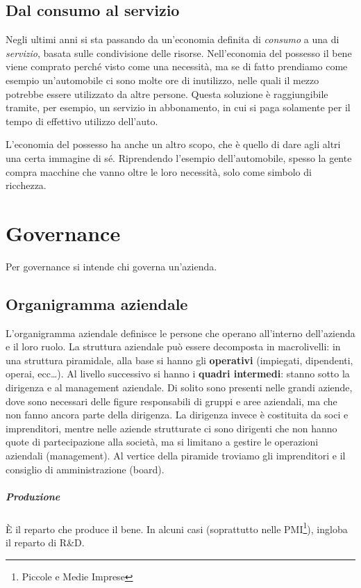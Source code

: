 \section{Dal consumo al servizio} 

Negli ultimi anni si sta passando da un'economia definita di \textit{consumo} a
una di \textit{servizio}, basata sulle condivisione delle risorse.
Nell'economia del possesso il bene viene comprato perché visto come una
necessità, ma se di fatto prendiamo come esempio un'automobile ci sono molte ore
di inutilizzo, nelle quali il mezzo potrebbe essere utilizzato da altre persone.
Questa soluzione è raggiungibile tramite, per esempio, un servizio in
abbonamento, in cui si paga solamente per il tempo di effettivo utilizzo 
dell'auto.

L'economia del possesso ha anche un altro scopo, che è quello di dare agli altri
una certa immagine di sé. Riprendendo l'esempio dell'automobile, spesso la gente
compra macchine che vanno oltre le loro necessità, solo come simbolo di 
ricchezza.


\chapter{Governance}

Per governance si intende chi governa un'azienda.

\section{Organigramma aziendale}
L'organigramma aziendale definisce le persone che operano all'interno
dell'azienda e il loro ruolo. La struttura aziendale può essere decomposta in
macrolivelli: in una struttura piramidale, alla base si hanno gli
\textbf{operativi} (impiegati, dipendenti, operai, ecc\dots). Al livello
successivo si hanno i \textbf{quadri intermedi}: stanno sotto la dirigenza e al
management aziendale. Di solito sono presenti nelle grandi aziende, dove sono
necessari delle figure responsabili di gruppi e aree aziendali, ma che non
fanno ancora parte della dirigenza. La dirigenza invece è costituita da soci e
imprenditori, mentre nelle aziende strutturate ci sono dirigenti che non hanno
quote di partecipazione alla società, ma si limitano a gestire le operazioni
aziendali (management). Al vertice della piramide troviamo gli imprenditori 
e il consiglio di amministrazione (board).

\paragraph*{Produzione} È il reparto che produce il bene. In alcuni casi
(soprattutto nelle PMI\footnote{Piccole e Medie Imprese}), ingloba il
reparto di R\&D.

